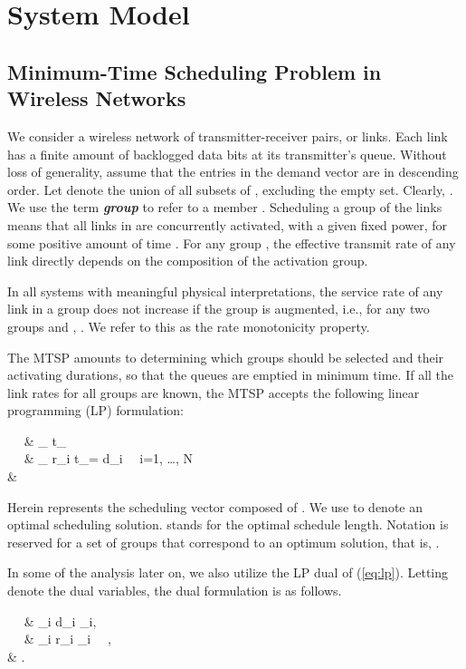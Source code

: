 \documentclass[10pt,onecolumn,journal,draftcls,oneside]{IEEEtran}
\newcommand{\CN}{\mathcal{N}}
\newcommand{\CH}{\mathcal{H}}
\newcommand{\Cc}{\mathpzc{c}}
\newcommand{\Bt}{\boldsymbol{t}}
\newcommand{\Bpi}{\boldsymbol{\pi}}
\begin{document}
\section{System Model}
\label{sec:system}
\subsection{Minimum-Time Scheduling Problem in Wireless Networks}
We consider a wireless network of  transmitter-receiver pairs, or links. Each link  has a finite amount of backlogged data bits  at its transmitter's queue. Without loss of generality, assume that the entries in the demand vector  are in descending order. Let  denote the union of all subsets of , excluding the empty set. Clearly, . We use the term {\bf\emph{group}} to refer to a member . Scheduling a group  of the  links means that all links in  are concurrently activated, with a given fixed power, for some positive amount of time . For any group , the effective transmit rate  of any link  directly depends on the composition of the activation group. 

In all systems with meaningful physical interpretations, the service rate of any link in a group does not increase if the group is augmented, i.e., for any two groups  and , . We refer to this as the rate monotonicity property.

The MTSP amounts to determining which groups should be selected and their activating durations, so that the queues are emptied in minimum time.
If all the link rates for all  groups  are known, the MTSP accepts the following linear programming (LP) formulation:

\min~~ & \sum_{\Cc \in \CH} t_\Cc \label{eq:lpobj}\\
~~ & \sum_{\Cc \in \CH} r_{i\Cc} t_\Cc = d_i ~~i=1, \dots, N \label{eq:lpcons} \\
& \Bt {}


Herein  represents the scheduling vector composed of . We use  to denote an optimal scheduling solution.  stands for the optimal schedule length. Notation  is reserved for a set of groups that correspond to an optimum solution, that is, . 

In some of the analysis later on, we also utilize the LP dual of (\ref{eq:lp}). Letting  denote the dual variables, the dual formulation is as follows.


\max~~ & \sum_{i \in \CN} d_i \pi_i, \label{eq:dualobj}\\
~~ & \sum_{i \in \Cc} r_{i\Cc} \pi_i ~~\Cc \in \CH, \label{eq:dualcons} \\
& \Bpi {}.
\end{document}

